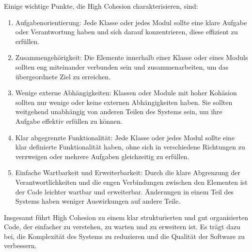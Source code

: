Einige wichtige Punkte, die High Cohesion charakterisieren, sind:

\begin{enumerate}
    \item Aufgabenorientierung: Jede Klasse oder jedes Modul sollte eine klare Aufgabe oder Verantwortung haben und sich darauf konzentrieren, diese effizient zu erfüllen.
    \item Zusammengehörigkeit: Die Elemente innerhalb einer Klasse oder eines Moduls sollten eng miteinander verbunden sein und zusammenarbeiten, um das übergeordnete Ziel zu erreichen.
    \item Wenige externe Abhängigkeiten: Klassen oder Module mit hoher Kohäsion sollten nur wenige oder keine externen Abhängigkeiten haben. Sie sollten weitgehend unabhängig von anderen Teilen des Systems sein, um ihre Aufgabe effektiv erfüllen zu können.
    \item Klar abgegrenzte Funktionalität: Jede Klasse oder jedes Modul sollte eine klar definierte Funktionalität haben, ohne sich in verschiedene Richtungen zu verzweigen oder mehrere Aufgaben gleichzeitig zu erfüllen.
    \item Einfache Wartbarkeit und Erweiterbarkeit: Durch die klare Abgrenzung der Verantwortlichkeiten und die engen Verbindungen zwischen den Elementen ist der Code leichter wartbar und erweiterbar. Änderungen in einem Teil des Systems haben weniger Auswirkungen auf andere Teile.
\end{enumerate}

Insgesamt führt High Cohesion zu einem klar strukturierten und gut organisierten Code, der einfacher zu verstehen, zu warten und zu erweitern ist. Es trägt dazu bei, die Komplexität des Systems zu reduzieren und die Qualität der Software zu verbessern.


